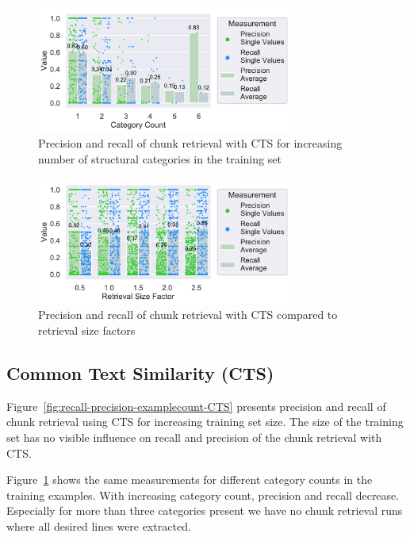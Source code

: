 \documentclass[\myrootdir/main.tex]{subfiles}
\begin{document}
\begin{figure}[htbp]
		\centering
		\includegraphics[width=0.75\textwidth, clip]{img/big-study/recall-precision-categorycount-CTS.pdf}
		\caption{Precision and recall of chunk retrieval with CTS for increasing number of structural categories in the training set}
		\label{fig:recall-precision-categorycount-CTS}
\end{figure}

\begin{figure}[htbp]
		\centering
		\includegraphics[width=0.75\textwidth, clip]{img/big-study/contextsizefactor-precision-recall-CTS.pdf}
		\caption{Precision and recall of chunk retrieval with CTS compared to retrieval size factors}
		\label{fig:contextsizefactor-precision-recall-CTS}
\end{figure}

\subsection{Common Text Similarity (CTS)}
Figure~\ref{fig:recall-precision-examplecount-CTS} presents precision and recall of chunk retrieval using CTS for increasing training set size.
The size of the training set has no visible influence on recall and precision of the chunk retrieval with CTS\@.

Figure~\ref{fig:recall-precision-categorycount-CTS} shows the same measurements for different category counts in the training examples.
With increasing category count, precision and recall decrease.
Especially for more than three categories present we have no chunk retrieval runs where all desired lines were extracted.
\end{document}
